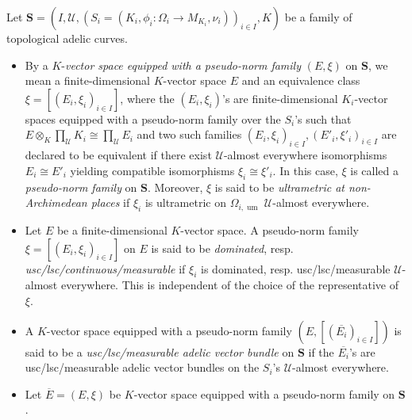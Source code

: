 \documentclass [11pt,reqno]{amsart}
\newcommand{\1}{\mathmybb{1}}
\def\cU{{\mathcal{U}}}
\def\um{\operatorname{um}}
\begin{document}
\begin{proposition-definition}
\label{prop-def:adelic_vector_bundles_families_tac}
Let $\mathbf{S}=(I,\cU,(S_{i}=(K_{i},\phi_{i}:\Omega_{i}\to M_{K_{i}},\nu_{i}))_{i\in I},K)$ be a family of topological adelic curves. %

\begin{itemize}
	\item[(1)] By a $K$-\emph{vector space equipped with a pseudo-norm family} $(E,\xi)$ on $\mathbf{S}$, we mean a finite-dimensional $K$-vector space $E$ and an equivalence class $\xi=[(E_{i},\xi_{i})_{i\in I}]$, where the $(E_{i},\xi_{i})$'s are finite-dimensional $K_{i}$-vector spaces equipped with a pseudo-norm family over the $S_{i}$'s such that $E\otimes_{K}\prod_{\cU}K_{i}\cong \prod_{\cU}E_{i}$ and two such families $(E_{i},\xi_{i})_{i\in I},(E'_{i},\xi'_{i})_{i\in I}$ are declared to be equivalent if there exist $\cU$-almost everywhere isomorphisms $E_{i}\cong E'_{i}$ yielding compatible isomorphisms $\xi_{i}\cong\xi'_{i}$. In this case, $\xi$ is called a \emph{pseudo-norm family} on $\mathbf{S}$. Moreover, $\xi$ is said to be \emph{ultrametric at non-Archimedean places} if $\xi_{i}$ is ultrametric on $\Omega_{i,\um}$ $\cU$-almost everywhere.
	\item[(2)] Let $E$ be a finite-dimensional $K$-vector space. A pseudo-norm family $\xi=[(E_{i},\xi_{i})_{i\in I}]$ on $E$ is said to be \emph{dominated}, resp. \emph{usc/lsc/continuous/measurable} if $\xi_{i}$ is dominated, resp. usc/lsc/measurable $\cU$-almost everywhere. This is independent of the choice of the representative of $\xi$.
	\item[(3)] A $K$-vector space equipped with a pseudo-norm family $(E,[(\overline{E_{i}})_{i\in I}])$ is said to be a \emph{usc/lsc/measurable adelic vector bundle} on $\mathbf{S}$ if the $\overline{E_{i}}$'s are usc/lsc/measurable adelic vector bundles on the $S_{i}$'s $\cU$-almost everywhere.
	\item[(4)] Let $\overline{E}=(E,\xi)$ be $K$-vector space equipped with a pseudo-norm family on $\mathbf{S}$. 
	\begin{itemize}

\end{itemize}
\end{itemize}
\end{proposition-definition}
\end{document}
